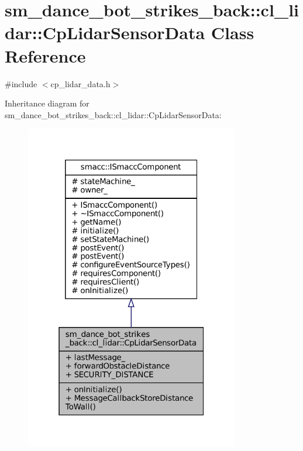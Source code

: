 \hypertarget{classsm__dance__bot__strikes__back_1_1cl__lidar_1_1CpLidarSensorData}{}\section{sm\+\_\+dance\+\_\+bot\+\_\+strikes\+\_\+back\+:\+:cl\+\_\+lidar\+:\+:Cp\+Lidar\+Sensor\+Data Class Reference}
\label{classsm__dance__bot__strikes__back_1_1cl__lidar_1_1CpLidarSensorData}


{\ttfamily \#include $<$cp\+\_\+lidar\+\_\+data.\+h$>$}



Inheritance diagram for sm\+\_\+dance\+\_\+bot\+\_\+strikes\+\_\+back\+:\+:cl\+\_\+lidar\+:\+:Cp\+Lidar\+Sensor\+Data\+:
\nopagebreak
\begin{figure}[H]
\begin{center}
\leavevmode
\includegraphics[width=265pt]{classsm__dance__bot__strikes__back_1_1cl__lidar_1_1CpLidarSensorData__inherit__graph}
\end{center}
\end{figure}


